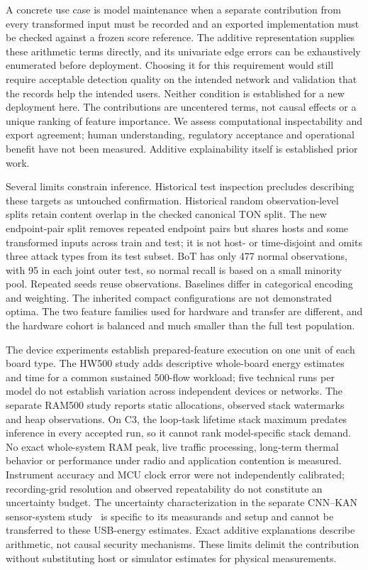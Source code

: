 \documentclass{ieeeaccess}
\begin{document}
A concrete use case is model maintenance when a separate contribution from every transformed input must be recorded and an exported implementation must be checked against a frozen score reference. The additive representation supplies these arithmetic terms directly, and its univariate edge errors can be exhaustively enumerated before deployment. Choosing it for this requirement would still require acceptable detection quality on the intended network and validation that the records help the intended users. Neither condition is established for a new deployment here. The contributions are uncentered terms, not causal effects or a unique ranking of feature importance. We assess computational inspectability and export agreement; human understanding, regulatory acceptance and operational benefit have not been measured. Additive explainability itself is established prior work.

Several limits constrain inference. Historical test inspection precludes describing these targets as untouched confirmation. Historical random observation-level splits retain content overlap in the checked canonical TON split. The new endpoint-pair split removes repeated endpoint pairs but shares hosts and some transformed inputs across train and test; it is not host- or time-disjoint and omits three attack types from its test subset. BoT has only 477 normal observations, with 95 in each joint outer test, so normal recall is based on a small minority pool. Repeated seeds reuse observations. Baselines differ in categorical encoding and weighting. The inherited compact configurations are not demonstrated optima. The two feature families used for hardware and transfer are different, and the hardware cohort is balanced and much smaller than the full test population.

The device experiments establish prepared-feature execution on one unit of each board type. The HW500 study adds descriptive whole-board energy estimates and time for a common sustained 500-flow workload; five technical runs per model do not establish variation across independent devices or networks. The separate RAM500 study reports static allocations, observed stack watermarks and heap observations. On C3, the loop-task lifetime stack maximum predates inference in every accepted run, so it cannot rank model-specific stack demand. No exact whole-system RAM peak, live traffic processing, long-term thermal behavior or performance under radio and application contention is measured. Instrument accuracy and MCU clock error were not independently calibrated; recording-grid resolution and observed repeatability do not constitute an uncertainty budget. The uncertainty characterization in the separate CNN--KAN sensor-system study~\cite{faggi2026sensor} is specific to its measurands and setup and cannot be transferred to these USB-energy estimates. Exact additive explanations describe arithmetic, not causal security mechanisms. These limits delimit the contribution without substituting host or simulator estimates for physical measurements.
\end{document}
